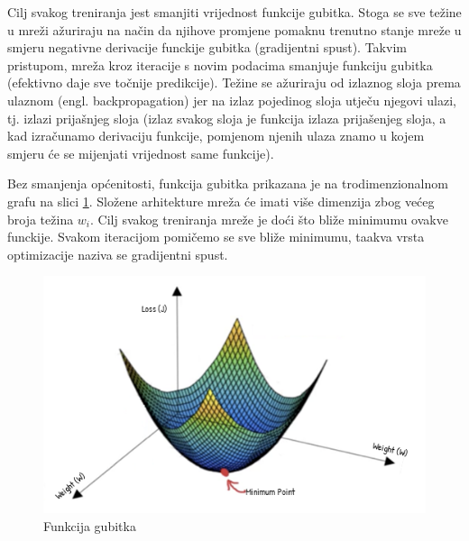 

Cilj svakog treniranja jest smanjiti vrijednost funkcije gubitka. Stoga se sve težine u mreži
ažuriraju na način da njihove promjene pomaknu trenutno stanje mreže u smjeru negativne derivacije
funckije gubitka (gradijentni spust). Takvim pristupom, mreža kroz iteracije s novim podacima smanjuje funkciju gubitka
(efektivno daje sve točnije predikcije). Težine se ažuriraju od izlaznog sloja prema ulaznom 
(engl. backpropagation) jer na izlaz pojedinog sloja utječu njegovi ulazi, tj. izlazi prijašnjeg
sloja (izlaz svakog sloja je funkcija izlaza prijašenjeg sloja, a kad izračunamo derivaciju
funkcije, pomjenom njenih ulaza znamo u kojem smjeru će se mijenjati vrijednost same funkcije).



Bez smanjenja općenitosti, funkcija gubitka prikazana je na trodimenzionalnom grafu
na slici \ref{pic:descent}. Složene arhitekture mreža će imati više dimenzija zbog većeg broja
težina \( w_i \). Cilj svakog treniranja mreže je doći što bliže minimumu ovakve funckije.
Svakom iteracijom pomičemo se sve bliže minimumu, taakva vrsta optimizacije naziva se
gradijentni spust.

\begin{figure}[htb]
  \centering
  \includegraphics[width=0.5\linewidth]{Chapters/neuronska_mreza/descent.png} 
  \caption{Funkcija gubitka \cite{desc}}
  \label{pic:descent}
\end{figure}






